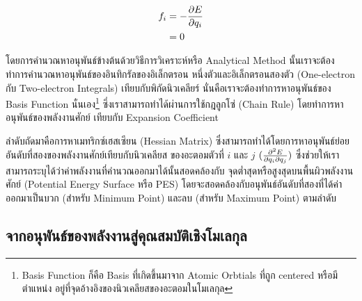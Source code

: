 \begin{align}
    f_{i} & = - \pdv{E}{q_{i}} \\
          & = 0
\end{align}

โดยการคำนวณหาอนุพันธ์ข้างต้นด้วยวิธีการวิเคราะห์หรือ Analytical Method นั้นเราจะต้องทำการคำนวณหาอนุพันธ์ของอินทิกรัลของอิเล็กตรอน%
หนึ่งตัวและอิเล็กตรอนสองตัว (One-electron กับ Two-electron Integrals) เทียบกับพิกัดนิวเคลียร์ นั่นคือเราจะต้องทำการหาอนุพันธ์ของ
Basis Function นั่นเอง\footnote{Basis Function ก็คือ Basis ที่เกิดขึ้นมาจาก Atomic Orbtials ที่ถูก centered หรือมีตำแหน่ง%
    อยู่ที่จุดอ้างอิงของนิวเคลียสของอะตอมในโมเลกุล} ซึ่งเราสามารถทำได้ผ่านการใช้กฎลูกโซ่ (Chain Rule) โดยทำการหาอนุพันธ์ของพลังงานศักย์%
เทียบกับ Expansion Coefficient

ลำดับถัดมาคือการหาเมทริกซ์เฮสเซียน (Hessian Matrix) ซึ่งสามารถทำได้โดยการหาอนุพันธ์ย่อยอันดับที่สองของพลังงานศักย์เทียบกับนิวเคลียส%
ของอะตอมตัวที่ $i$ และ $j$ $(\pdv{E}{q_{i}}{q_{j}})$ ซึ่งช่วยให้เราสามารถระบุได้ว่าค่าพลังงานที่คำนวณออกมาได้นั้นสอดคล้องกับ%
จุดต่ำสุดหรือสูงสุดบนพื้นผิวพลังงานศักย์ (Potential Energy Surface หรือ PES) โดยจะสอดคล้องกับอนุพันธ์อันดับที่สองที่ได้ค่าออกมาเป็นบวก
(สำหรับ Minimum Point) และลบ (สำหรับ Maximum Point) ตามลำดับ

\subsection{จากอนุพันธ์ของพลังงานสู่คุณสมบัติเชิงโมเลกุล}
\label{ssec:ener_der_mol_prop}

